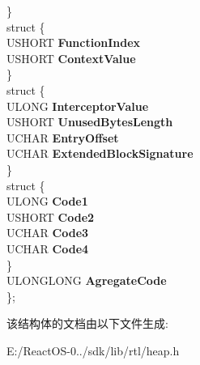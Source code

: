 \begin{DoxyCompactItemize}
\begin{tabbing}
\>\} \\
\mbox{\label{union___h_e_a_p___c_o_m_m_o_n___e_n_t_r_y_1_1_0D3638_a4c0dc38588202e8954f083866ff3d231}} 
\>struct \{\\
\>\>USHORT {\bfseries FunctionIndex}\\
\>\>USHORT {\bfseries ContextValue}\\
\>\} \\
\mbox{\label{union___h_e_a_p___c_o_m_m_o_n___e_n_t_r_y_1_1_0D3638_a81c7a1098c3098e12967507bb8ed8dba}} 
\>struct \{\\
\>\>ULONG {\bfseries InterceptorValue}\\
\>\>USHORT {\bfseries UnusedBytesLength}\\
\>\>UCHAR {\bfseries EntryOffset}\\
\>\>UCHAR {\bfseries ExtendedBlockSignature}\\
\>\} \\
\mbox{\label{union___h_e_a_p___c_o_m_m_o_n___e_n_t_r_y_1_1_0D3638_ae69807507bf33ba183bb7ce8a786c7cd}} 
\>struct \{\\
\>\>ULONG {\bfseries Code1}\\
\>\>USHORT {\bfseries Code2}\\
\>\>UCHAR {\bfseries Code3}\\
\>\>UCHAR {\bfseries Code4}\\
\>\} \\
\>ULONGLONG {\bfseries AgregateCode}\\
\}; \\

\end{tabbing}\end{DoxyCompactItemize}


该结构体的文档由以下文件生成\+:\begin{DoxyCompactItemize}
\item 
E\+:/\+React\+O\+S-\/0../sdk/lib/rtl/heap.\+h\end{DoxyCompactItemize}
